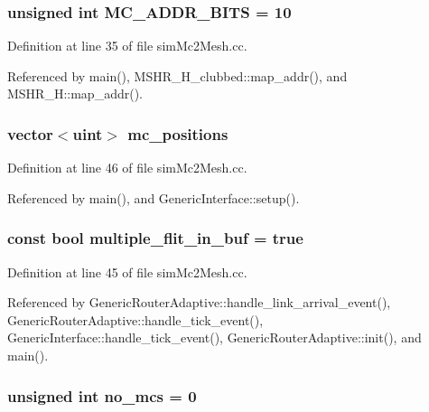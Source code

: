 \subsubsection[{MC\_\-ADDR\_\-BITS}]{\setlength{\rightskip}{0pt plus 5cm}unsigned int {\bf MC\_\-ADDR\_\-BITS} = 10}\label{simMc2Mesh_8cc_5797f7fc969d8a7c02df4ba708ed734f}




Definition at line 35 of file simMc2Mesh.cc.

Referenced by main(), MSHR\_\-H\_\-clubbed::map\_\-addr(), and MSHR\_\-H::map\_\-addr().
\subsubsection[{mc\_\-positions}]{\setlength{\rightskip}{0pt plus 5cm}vector$<${\bf uint}$>$ {\bf mc\_\-positions}}\label{simMc2Mesh_8cc_f58ebe62f79b2e470f0cb7da0f7a7ea5}




Definition at line 46 of file simMc2Mesh.cc.

Referenced by main(), and GenericInterface::setup().
\subsubsection[{multiple\_\-flit\_\-in\_\-buf}]{\setlength{\rightskip}{0pt plus 5cm}const bool {\bf multiple\_\-flit\_\-in\_\-buf} = true}\label{simMc2Mesh_8cc_6e9030ac7a1abb7387b696f49bcf0fde}




Definition at line 45 of file simMc2Mesh.cc.

Referenced by GenericRouterAdaptive::handle\_\-link\_\-arrival\_\-event(), GenericRouterAdaptive::handle\_\-tick\_\-event(), GenericInterface::handle\_\-tick\_\-event(), GenericRouterAdaptive::init(), and main().
\subsubsection[{no\_\-mcs}]{\setlength{\rightskip}{0pt plus 5cm}unsigned int {\bf no\_\-mcs} = 0}\label{simMc2Mesh_8cc_544ce85a29feb73c485a704009deffd1}




